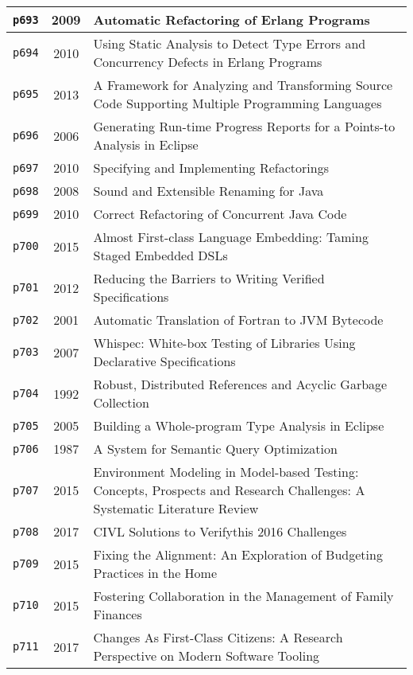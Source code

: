 \begin{longtable}{| c | c | p{16cm} |}
  \hline
  \texttt{p693} & 2009 & Automatic Refactoring of Erlang Programs \\
  \hline
  \texttt{p694} & 2010 & Using Static Analysis to Detect Type Errors and Concurrency Defects in Erlang Programs \\
  \hline
  \texttt{p695} & 2013 & A Framework for Analyzing and Transforming Source Code Supporting Multiple Programming Languages \\
  \hline
  \texttt{p696} & 2006 & Generating Run-time Progress Reports for a Points-to Analysis in Eclipse \\
  \hline
  \texttt{p697} & 2010 & Specifying and Implementing Refactorings \\
  \hline
  \texttt{p698} & 2008 & Sound and Extensible Renaming for Java \\
  \hline
  \texttt{p699} & 2010 & Correct Refactoring of Concurrent Java Code \\
  \hline
  \texttt{p700} & 2015 & Almost First-class Language Embedding: Taming Staged Embedded DSLs \\
  \hline
  \texttt{p701} & 2012 & Reducing the Barriers to Writing Verified Specifications \\
  \hline
  \texttt{p702} & 2001 & Automatic Translation of Fortran to JVM Bytecode \\
  \hline
  \texttt{p703} & 2007 & Whispec: White-box Testing of Libraries Using Declarative Specifications \\
  \hline
  \texttt{p704} & 1992 & Robust, Distributed References and Acyclic Garbage Collection \\
  \hline
  \texttt{p705} & 2005 & Building a Whole-program Type Analysis in Eclipse \\
  \hline
  \texttt{p706} & 1987 & A System for Semantic Query Optimization \\
  \hline
  \texttt{p707} & 2015 & Environment Modeling in Model-based Testing: Concepts, Prospects and Research Challenges: A Systematic Literature Review \\
  \hline
  \texttt{p708} & 2017 & CIVL Solutions to Verifythis 2016 Challenges \\
  \hline
  \texttt{p709} & 2015 & Fixing the Alignment: An Exploration of Budgeting Practices in the Home \\
  \hline
  \texttt{p710} & 2015 & Fostering Collaboration in the Management of Family Finances \\
  \hline
  \texttt{p711} & 2017 & Changes As First-Class Citizens: A Research Perspective on Modern Software Tooling \\

\end{longtable}
